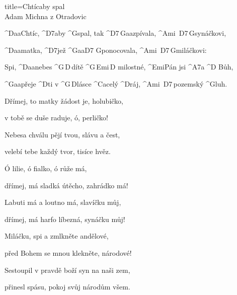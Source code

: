 \begin{song}{title=\predtitle\centering Chtíc\carka aby spal \\\large Adam Michna z Otradovic   \vspace*{-0.3cm}}  %
\begin{centerjustified}
\nejnejvetsi

\sloka 
	^{D{\color{white}aa}}Chtíc, ^{D7}aby ^{G}spal, tak ^{D7\,G{\color{white}aa}}zpívala, ^{Ami\,\,\,D7\,G}synáčkovi,

	^{D{\color{white}aa}}matka, ^{D7}jež ^{G{\color{white}aa}D7\,\,G}ponocovala, ^{Ami\,\,\,D7\,G}miláčkovi:

	Spi, ^{D{\color{white}aa}}nebes ^{G\,D\,}dítě ^{G\,Emi\,D\,\,}milostné, ^{Emi}Pán jsi ^{A7}a ^{D\,\,}Bůh,

	^{G{\color{white}aa}}přeje ^{D}ti v ^{G\,D}lásce ^{C{\color{white}a}}celý ^{D}ráj, ^{Ami\,\,\,D7\,}pozemský ^{G}luh.

\sloka
	Dřímej, to matky žádost je, holubičko,
   
   	v tobě se duše raduje, ó, perličko!
   	
   	Nebesa chválu pějí tvou, slávu a čest,
	
	velebí tebe každý tvor, tisíce hvěz.

\sloka	
	Ó lilie, ó fialko, ó růže má,
	
	dřímej, má sladká útěcho, zahrádko má!
	
	Labuti má a loutno má, slavíčku můj,

	dřímej, má harfo líbezná, synáčku můj!

\sloka	
	Miláčku, spi a zmlkněte andělové,
   	
   	před Bohem se mnou klekněte, národové!
	
	Sestoupil v pravdě boží syn na naši zem,
	
	přinesl spásu, pokoj svůj národům všem.




\end{centerjustified}
\setcounter{Slokočet}{0}
\end{song}

